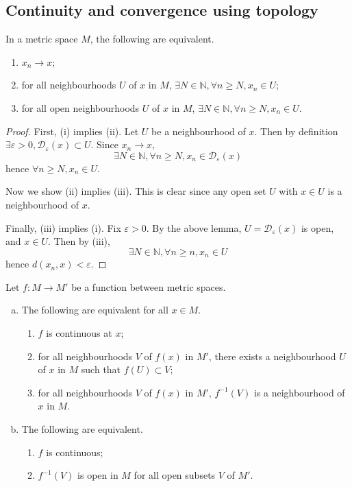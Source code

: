\subsection{Continuity and convergence using topology}
\begin{proposition}
	In a metric space \( M \), the following are equivalent.
	\begin{enumerate}
		\item \( x_n \to x \);
		\item for all neighbourhoods \( U \) of \( x \) in \( M \), \( \exists N \in \mathbb N, \forall n \geq N, x_n \in U \);
		\item for all open neighbourhoods \( U \) of \( x \) in \( M \), \( \exists N \in \mathbb N, \forall n \geq N, x_n \in U \).
	\end{enumerate}
\end{proposition}
\begin{proof}
	First, (i) implies (ii).
	Let \( U \) be a neighbourhood of \( x \).
	Then by definition \( \exists \varepsilon > 0, \mathcal D_\varepsilon(x) \subset U \).
	Since \( x_n \to x \),
	\[
		\exists N \in \mathbb N, \forall n \geq N, x_n \in \mathcal D_\varepsilon(x)
	\]
	hence \( \forall n \geq N, x_n \in U \).

	Now we show (ii) implies (iii).
	This is clear since any open set \( U \) with \( x \in U \) is a neighbourhood of \( x \).

	Finally, (iii) implies (i).
	Fix \( \varepsilon > 0 \).
	By the above lemma, \( U = \mathcal D_\varepsilon(x) \) is open, and \( x \in U \).
	Then by (iii),
	\[
		\exists N \in \mathbb N, \forall n \geq n, x_n \in U
	\]
	hence \( d(x_n, x) < \varepsilon \).
\end{proof}
\begin{proposition}
	Let \( f \colon M \to M' \) be a function between metric spaces.
	\begin{enumerate}[(a)]
		\item The following are equivalent for all \( x \in M \).
		      \begin{enumerate}
			      \item \( f \) is continuous at \( x \);
			      \item for all neighbourhoods \( V \) of \( f(x) \) in \( M' \), there exists a neighbourhood \( U \) of \( x \) in \( M \) such that \( f(U) \subset V \);
			      \item for all neighbourhoods \( V \) of \( f(x) \) in \( M' \), \( f^{-1}(V) \) is a neighbourhood of \( x \) in \( M \).
		      \end{enumerate}
		\item The following are equivalent.
		      \begin{enumerate}
			      \item \( f \) is continuous;
			      \item \( f^{-1}(V) \) is open in \( M \) for all open subsets \( V \) of \( M' \).
		      \end{enumerate}
	\end{enumerate}
\end{proposition}
